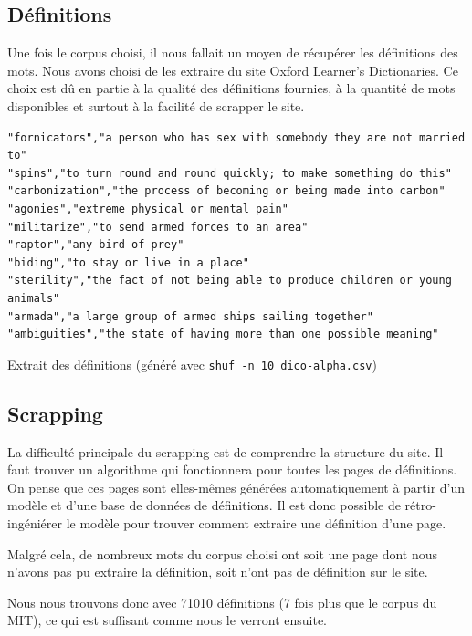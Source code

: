 \documentclass[french]{template}
\begin{document}
\subsection{Définitions}

Une fois le corpus choisi, il nous fallait un moyen de récupérer les définitions des mots. Nous avons choisi de les extraire du site Oxford Learner's Dictionaries. Ce choix est dû en partie à la qualité des définitions fournies, à la quantité de mots disponibles et surtout à la facilité de scrapper le site.

\begin{listing}[H]
    \begin{verbatim}
"fornicators","a person who has sex with somebody they are not married to"
"spins","to turn round and round quickly; to make something do this"
"carbonization","the process of becoming or being made into carbon"
"agonies","extreme physical or mental pain"
"militarize","to send armed forces to an area"
"raptor","any bird of prey"
"biding","to stay or live in a place"
"sterility","the fact of not being able to produce children or young animals"
"armada","a large group of armed ships sailing together"
"ambiguities","the state of having more than one possible meaning"
\end{verbatim}
    \caption{Extrait des définitions (généré avec \texttt{shuf -n 10 dico-alpha.csv})}
    \label{listing:definitions}
\end{listing}

\subsection{Scrapping}

La difficulté principale du scrapping est de comprendre la structure du site. Il faut trouver un algorithme qui fonctionnera pour toutes les pages de définitions. On pense que ces pages sont elles-mêmes générées automatiquement à partir d'un modèle et d'une base de données de définitions. Il est donc possible de rétro-ingéniérer le modèle pour trouver comment extraire une définition d'une page.

Malgré cela, de nombreux mots du corpus choisi ont soit une page dont nous n'avons pas pu extraire la définition, soit n'ont pas de définition sur le site.

Nous nous trouvons donc avec 71010 définitions (7 fois plus que le corpus du MIT), ce qui est suffisant comme nous le verront ensuite.
\end{document}
